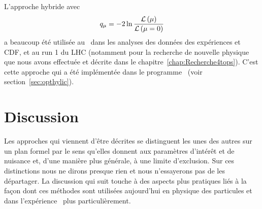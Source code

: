 L'approche hybride avec 
\begin{equation}
\label{eq:testStatOTH}
q_\mu=-2\ln\frac{{\cal L}\left(\mu\right)}{{\cal L}\left(\mu=0\right)}
\end{equation}
a beaucoup \'et\'e utilis\'ee au \tevatron~dans les analyses des donn\'ees des exp\'eriences \Dzero et CDF, et au run 1 du LHC (notamment pour la recherche de nouvelle physique que nous avons effectu\'ee et d\'ecrite dans le chapitre~\ref{chap:Recherche4tops}). C'est cette approche qui a \'et\'e impl\'ement\'ee dans le programme \opthylic~(voir section~\ref{sec:opthylic}).

\section{Discussion}

Les approches qui viennent d'\^etre d\'ecrites se distinguent les unes des autres sur un plan formel par le sens qu'elles donnent aux param\`etres d'int\'er\^et et de nuisance et, d'une mani\`ere plus g\'en\'erale, \`a une limite d'exclusion. Sur ces distinctions nous ne dirons presque rien et nous n'essayerons pas de les d\'epartager. La discussion qui suit touche \`a des aspects plus pratiques li\'es \`a la fa\c con dont ces m\'ethodes sont utilis\'ees aujourd'hui en physique des particules et dans l'exp\'erience \ATLAS~plus particuli\`erement.

